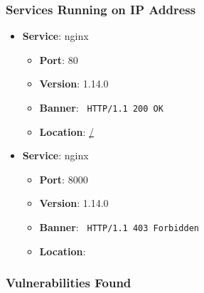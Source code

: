 \documentclass{article}
\begin{document}
\subsubsection*{Services Running on IP Address}

\begin{itemize}
    
        \item \textbf{Service}: nginx
        \begin{itemize}
            \item \textbf{Port}: 80
            \item \textbf{Version}:  1.14.0 
            \item \textbf{Banner}: \texttt{
                HTTP/1.1 200 OK
            }
            \item \textbf{Location}: \href{ / }{ / }
        \end{itemize}
    
        \item \textbf{Service}: nginx
        \begin{itemize}
            \item \textbf{Port}: 8000
            \item \textbf{Version}:  1.14.0 
            \item \textbf{Banner}: \texttt{
                HTTP/1.1 403 Forbidden
            }
            \item \textbf{Location}: \href{  }{  }
        \end{itemize}
    
\end{itemize}


\subsubsection*{Vulnerabilities Found}
\end{document}
